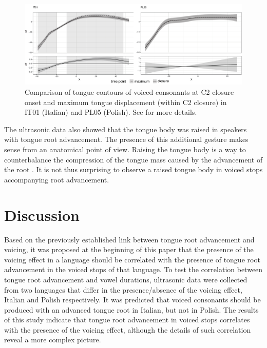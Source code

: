 \documentclass[authoryear, twocolumn]{elsarticle}
\begin{document}
\begin{figure}
    \centering
    \includegraphics[width=.9\textwidth]{fig/voiced.pdf}
    \caption{Comparison of tongue contours of voiced consonants at C2 closure onset and maximum tongue displacement (within C2 closure) in IT01 (Italian) and PL05 (Polish). See  for more details.}
    \label{f:voiced}
\end{figure}

The ultrasonic data also showed that the tongue body was raised in
speakers with tongue root advancement. The presence of this additional
gesture makes sense from an anatomical point of view. Raising the tongue
body is a way to counterbalance the compression of the tongue mass
caused by the advancement of the root
\citep{perkell1969, jackson1988, sproat1993, kingston1997, fulop1998}.
It is not thus surprising to observe a raised tongue body in voiced
stops accompanying root advancement.

\section{Discussion}\label{discussion}

\label{s:discussion}

Based on the previously established link between tongue root advancement
and voicing, it was proposed at the beginning of this paper that the
presence of the voicing effect in a language should be correlated with
the presence of tongue root advancement in the voiced stops of that
language. To test the correlation between tongue root advancement and
vowel durations, ultrasonic data were collected from two languages that
differ in the presence/absence of the voicing effect, Italian and Polish
respectively. It was predicted that voiced consonants should be produced
with an advanced tongue root in Italian, but not in Polish. The results
of this study indicate that tongue root advancement in voiced stops
correlates with the presence of the voicing effect, although the details
of such correlation reveal a more complex picture.
\end{document}
